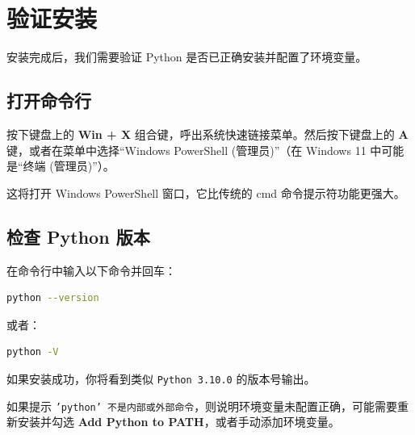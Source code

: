 ﻿\section{验证安装}

安装完成后，我们需要验证 Python 是否已正确安装并配置了环境变量。

\subsection{打开命令行}
按下键盘上的 \textbf{Win + X} 组合键，呼出系统快速链接菜单。然后按下键盘上的 \textbf{A} 键，或者在菜单中选择“Windows PowerShell (管理员)”（在 Windows 11 中可能是“终端 (管理员)”）。

这将打开 Windows PowerShell 窗口，它比传统的 cmd 命令提示符功能更强大。

\subsection{检查 Python 版本}
在命令行中输入以下命令并回车：

\begin{lstlisting}[language=bash]
python --version
\end{lstlisting}

或者：

\begin{lstlisting}[language=bash]
python -V
\end{lstlisting}

如果安装成功，你将看到类似 \texttt{Python 3.10.0} 的版本号输出。

如果提示 \texttt{'python' 不是内部或外部命令}，则说明环境变量未配置正确，可能需要重新安装并勾选 \textbf{Add Python to PATH}，或者手动添加环境变量。
\newpage
